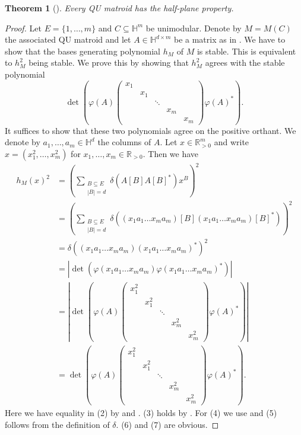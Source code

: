 \documentclass[11pt]{article}
\newtheorem{thm}[theo]{Theorem}
\theoremstyle{definition}
\numberwithin{equation}{section}
\newcommand{\R}{{\mathbb R}}
\newcommand{\HH}{{\mathbb H}}
\begin{document}
\begin{thm}[{\cite[Conjecture~6.9]{skewpartial}}]
    Every QU matroid has the half-plane property.
\end{thm}
\begin{proof}
  Let $E=\{1,\ldots,m\}$ and $C\subseteq\HH^m$ be unimodular. Denote by $M=M(C)$ the associated QU matroid and let $A\in\HH^{d\times m}$ be a matrix as in . We have to show that the bases generating polynomial $h_M$ of $M$ is stable. This is equivalent to $h_M^2$ being stable. We prove this by showing that $h_M^2$ agrees with the stable polynomial
  \begin{equation*}
    \det\left(\varphi(A)\begin{pmatrix}x_1&&&&\\&x_1&&&\\&&\ddots&&\\&&&x_m&\\&&&&x_m\end{pmatrix}\varphi(A)^*\right).  
  \end{equation*}
    It suffices to show that these two polynomials agree on the positive orthant. We denote by $a_1,\ldots,a_m\in\HH^d$ the columns of $A$. Let $x\in\R_{>0}^m$ and write $x=(x_1^2,\ldots,x_m^2)$ for $x_1,\ldots,x_m\in\R_{>0}$. Then we have
    \allowdisplaybreaks\begin{align}
        h_M(x)^2&=\left(\sum_{\substack{B\subseteq E\\|B|=d}}\delta(A[B]A[B]^*)x^B\right)^2\\
        &=\left(\sum_{\substack{B\subseteq E\\|B|=d}}\delta((x_1a_1\ldots x_ma_m)[B](x_1a_1\ldots x_ma_m)[B]^*)\right)^2\\
        &=\delta((x_1a_1\ldots x_ma_m)(x_1a_1\ldots x_ma_m)^*)^2\\
        &=|\det(\varphi(x_1a_1\ldots x_ma_m)\varphi(x_1a_1\ldots x_ma_m)^*)|\\
        &=|\det\left(\varphi(A)\begin{pmatrix}x_1^2&&&&\\&x_1^2&&&\\
        &&\ddots&&\\&&&x_m^2&\\&&&&x_m^2\end{pmatrix}\varphi(A)^*\right)|\\
        &=\det\left(\varphi(A)\begin{pmatrix}x_1^2&&&&\\&x_1^2&&&\\
        &&\ddots&&\\&&&x_m^2&\\&&&&x_m^2\end{pmatrix}\varphi(A)^*\right).
    \end{align}
    Here we have equality in (2) by  and . (3) holds  by . For (4) we use  and (5) follows from the definition of $\delta$. (6) and (7) are obvious.
\end{proof}
\end{document}
